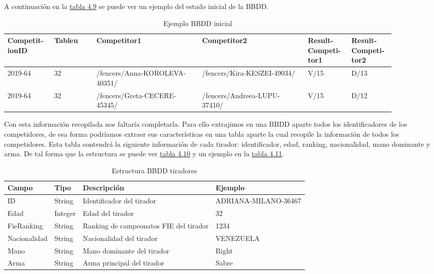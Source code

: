 A continuación en la \hyperref[tab:Ejemplo BBDD inicial iteracion5]{tabla 4.9} se puede ver un ejemplo del estado inicial de la \acs{BBDD}.

\begin{longtable}[]{|p{0.1\linewidth} p{0.1\linewidth} p{0.25\linewidth} p{0.25\linewidth} p{0.1\linewidth} p{0.1\linewidth}|}
  \caption{Ejemplo \acs{BBDD} inicial}
  \label{tab:Ejemplo BBDD inicial iteracion5}

  \endfirsthead
  \endhead

  \hline \rowcolor[HTML]{C0C0C0}
  Competit-ionID & Tableu & Competitor1 & Competitor2 & Result-Competi-tor1 & Result-Competi-tor2 \\ \hline
  2019-64 & 32 & /fencers/Anna-KOROLEVA-40351/ & /fencers/Kira-KESZEI-49034/ & V/15 & D/13 \\ \hline
  2019-64 & 32 & /fencers/Greta-CECERE-45345/ & /fencers/Andreea-LUPU-37410/ & V/15 & D/12 \\ \hline
\end{longtable}

\newpage

Con esta información recopilada nos faltaría completarla. Para ello extrajimos en una \acs{BBDD}
aparte todos los identificadores de los competidores, de esa forma podríamos extraer
sus características en una tabla aparte la cual recopile la información de todos
los competidores. Esta tabla contendrá la siguiente información de cada tirador:
identificador, edad, ranking, nacionalidad, mano dominante y arma. De tal forma
que la estructura se puede ver \hyperref[tab:Estructura BBDD tiradores]{tabla 4.10} y un ejemplo en la \hyperref[tab:Ejemplo BBDD tiradores]{tabla 4.11}.

\begin{table}[]
  \centering
  \caption{Estructura \acs{BBDD} tiradores}
  \label{tab:Estructura BBDD tiradores}
  \begin{tabular}{|llll|}
    \hline \rowcolor[HTML]{C0C0C0}
    Campo & Tipo & Descripción & Ejemplo \\ \hline
    ID & String & Identificador del tirador & ADRIANA-MILANO-36467 \\ \hline
    Edad & Integer & Edad del tirador & 32 \\ \hline
    FieRanking & String & Ranking de campeonatos \acs{FIE} del tirador & 1234 \\ \hline
    Nacionalidad & String & Nacionalidad del tirador & VENEZUELA \\ \hline
    Mano & String & Mano dominante del tirador & Right \\ \hline
    Arma & String & Arma principal del tirador & Sabre \\ \hline
  \end{tabular}
\end{table}


